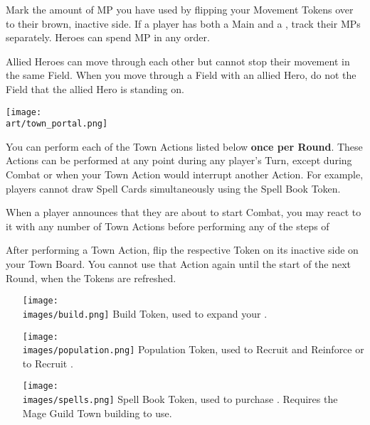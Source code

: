 \begin{multicols*}{2}
\bigskip

Mark the amount of MP you have used by flipping your Movement Tokens over to their brown, inactive side.
If a player has both a Main and a , track their MPs separately.
Heroes can spend MP in any order.\par
Allied Heroes can move through each other but cannot stop their movement in the same Field.
When you move through a Field with an allied Hero, do not  the Field that the allied Hero is standing on.\par


\vfill
\begin{center}
  \texttt{[image: \\art/town\_portal.png]}
\end{center}

\clearpage

You can perform each of the Town Actions listed below \textbf{once per Round}.
These Actions can be performed at any point during any player's Turn, except during Combat or when your Town Action would interrupt another Action.
For example, players cannot draw Spell Cards simultaneously using the Spell Book Token.\par
When a player announces that they are about to start Combat, you may react to it with any number of Town Actions before performing any of the steps of \par
After performing a Town Action, flip the respective Token on its inactive side on your Town Board.
You cannot use that Action again until the start of the next Round, when the Tokens are refreshed.
\begin{itemize}
  \item [{\texttt{[image: \\images/build.png]}}] Build Token, used to expand your .
  \item [{\texttt{[image: \\images/population.png]}}] Population Token, used to Recruit and Reinforce  or to Recruit .
  \item [{\texttt{[image: \\images/spells.png]}}]Spell Book Token, used to purchase . Requires the Mage Guild Town building to use.
\end{itemize}


\end{multicols*}
